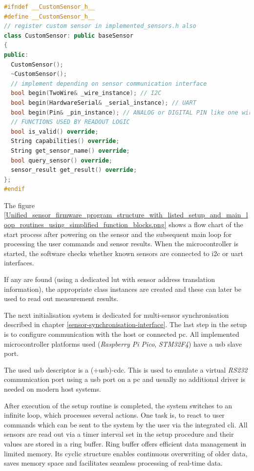 \newpage

\begin{lstlisting}[language={C++}, caption={CustomSensor-Class for adding new sensor hardware support into the unified sensor firmware package}, label=lst:CustomSensorClass]
#ifndef __CustomSensor_h__
#define __CustomSensor_h__
// register custom sensor in implemented_sensors.h also
class CustomSensor: public baseSensor
{
public:
  CustomSensor();
  ~CustomSensor();
  // implement depending on sensor communication interface
  bool begin(TwoWire& _wire_instance); // I2C
  bool begin(HardwareSerial& _serial_instance); // UART
  bool begin(Pin& _pin_instance); // ANALOG or DIGITAL PIN like one wire
  // FUNCTIONS USED BY READOUT LOGIC
  bool is_valid() override;
  String capabilities() override;
  String get_sensor_name() override;
  bool query_sensor() override;
  sensor_result get_result() override;
};
#endif
\end{lstlisting}

The figure
\ref{Unified_sensor_firmware_program_structure_with_listed_setup_and_main_loop_routines_using_simplified_function_blocks.png}
shows a flow chart of the start process after powering on the sensor and
the subsequent main loop for processing the user commands and sensor
results. When the microcontroller is started, the software checks
whether known sensors are connected to \gls{i2c} or \gls{uart}
interfaces.

If any are found (using a dedicated \gls{lut} with sensor address
translation information), the appropriate class instances are created
and these can later be used to read out measurement results.

The next initialisation system is dedicated for multi-sensor
synchronisation described in chapter
\ref{sensor-synchronisation-interface}. The last step in the setup is to
configure communication with the host or connected \gls{pc}. All
implemented microcontroller platforms used (\emph{Raspberry Pi Pico},
\emph{STM32F4}) have a \gls{usb} slave port.

The used usb descriptor is a (+usb)-\gls{cdc}. This is used to emulate a
virtual \emph{RS232} communication port using a \gls{usb} port on a
\gls{pc} and usually no additional driver is needed on modern host
systems.

After execution of the setup routine is completed, the system switches
to an infinite loop, which processes several actions. One task is, to
react to user commands which can be sent to the system by the user via
the integrated \gls{cli}. All sensors are read out via a timer interval
set in the setup procedure and their values are stored in a ring buffer.
Ring buffer offers efficient data management in limited memory. Its
cyclic structure enables continuous overwriting of older data, saves
memory space and facilitates seamless processing of real-time data.

